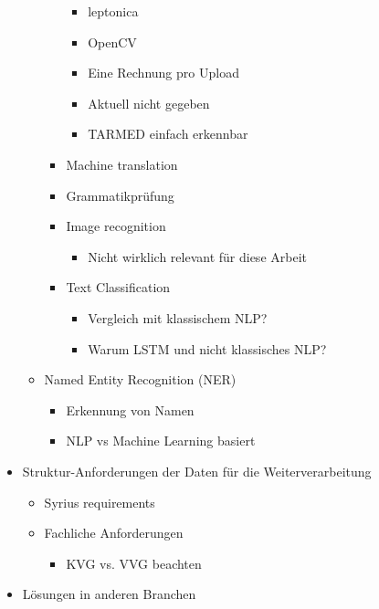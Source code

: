 \documentclass[12pt, twoside]{extarticle}
\begin{document}
\begin{itemize}
\begin{itemize}
\begin{itemize}
\begin{itemize}
							 \item leptonica
							 \item OpenCV
					\item Eine Rechnung pro Upload
						\item Aktuell nicht gegeben
						\item TARMED einfach erkennbar
                \end{itemize}				
			\item Machine translation
			\item Grammatikprüfung
			\item Image recognition
        \begin{itemize}
            \item Nicht wirklich relevant für diese Arbeit
        \end{itemize}
		\item Text Classification
        \begin{itemize}
			\item Vergleich mit klassischem NLP?
			\item Warum LSTM und nicht klassisches NLP?
        \end{itemize}
        \end{itemize}
		    \item Named Entity Recognition (NER)
        \begin{itemize}
			\item Erkennung von Namen
			\item NLP vs Machine Learning basiert
        \end{itemize}
    \end{itemize}
	\item Struktur-Anforderungen der Daten für die Weiterverarbeitung
    \begin{itemize}
		\item Syrius requirements
		\item Fachliche Anforderungen
        \begin{itemize}
    		\item KVG vs. VVG beachten
        \end{itemize}
    \end{itemize}
    \item Lösungen in anderen Branchen

\end{itemize}
\end{document}
